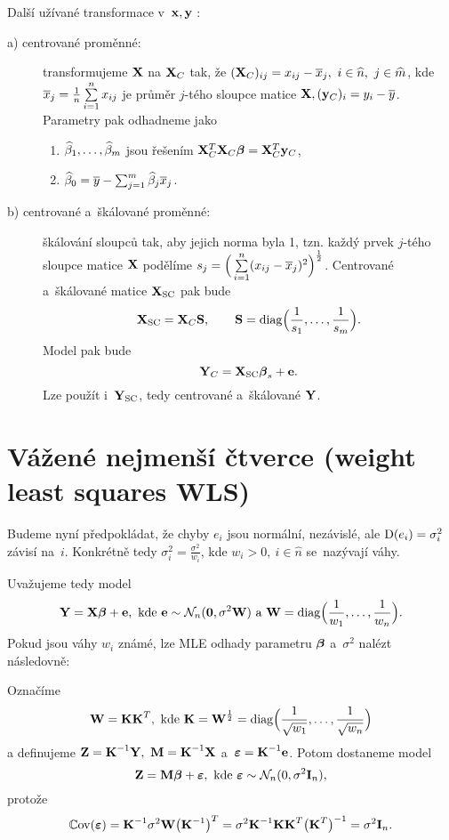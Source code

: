 \begin{remark}
	Další užívané transformace v~$\mathbf{x},\mathbf{y}$ :
	\begin{description}
	\item[a) centrované proměnné:] transformujeme $\mathbf{X}$ na $\mathbf{X}_C$ tak, že $(\mathbf{X}_C)_{ij} = x_{ij}-\overline{x}_j,~i\in\widehat{n},~j\in\widehat{m}$, kde $\overline{x}_j = \frac{1}{n}\sum\limits_{i=1}^{n} x_{ij}$ je průměr $j$-tého sloupce matice $\mathbf{X}, (\mathbf{y}_C)_i = y_i-\overline{y}$. Parametry pak odhadneme jako
	\begin{enumerate}[1)]
		\item $\widehat{\beta}_1, \dots, \widehat{\beta}_m$ jsou řešením $\mathbf{X}_C^T \mathbf{X}_C \boldsymbol{\beta} = \mathbf{X}_C^T \mathbf{y}_C$,
		\item $\widehat{\beta}_0 = \overline{y} - \sum_{j=1}^m \widehat{\beta}_j \overline{x}_j$.
	\end{enumerate}
	\item[b) centrované a~škálované proměnné:] škálování sloupců tak, aby jejich norma byla 1, tzn. každý prvek $j$-tého sloupce matice $\mathbf{X}$ podělíme $s_j = \Big(\sum\limits_{i=1}^{n} (x_{ij}-\overline{x}_j)^2\Big)^{\frac{1}{2}}$. Centrované a~škálované matice $\mathbf{X}_\mathrm{SC}$ pak bude
	 $$
	\mathbf{X}_\mathrm{SC} = \mathbf{X}_C\textbf{S},\qquad \textbf{S} = \mathrm{diag}\Big(\frac{1}{s_1},\dots,\frac{1}{s_m}\Big).
	 $$
	Model pak bude
	 $$
	\mathbf{Y}_C = \mathbf{X}_\mathrm{SC}\boldsymbol{\beta}_s+\mathbf{e}. $$ Lze použít i~$\mathbf{Y}_\mathrm{SC}$, tedy centrované a~škálované $\mathbf{Y}$.
	\end{description}
\end{remark}

\section{Vážené nejmenší čtverce (weight least squares WLS)}
Budeme nyní předpokládat, že chyby $e_i$ jsou normální, nezávislé, ale $\mathrm{D}(e_i) = \sigma_i^2$ závisí na~$i$. Konkrétně tedy $\sigma_i^2 = \frac{\sigma^2}{w_i}$, kde $w_i>0,~i\in\widehat{n}$ se~nazývají váhy.

Uvažujeme tedy model
\begin{equation}\label{rovnickaW}
\mathbf{Y} = \mathbf{X}\boldsymbol{\beta}+\mathbf{e},\text{ kde }\mathbf{e}\sim\mathcal{N}_n(\boldsymbol{0},\sigma^2\textbf{W})\text{ a~}\textbf{W} = \mathrm{diag}\Big(\frac{1}{w_1},\dots,\frac{1}{w_n}\Big).
\end{equation}
Pokud jsou váhy $w_i$ známé, lze MLE odhady parametru $\boldsymbol{\beta}$ a~$\sigma^2$ nalézt následovně:

Označíme
 $$
\textbf{W} = \textbf{K} \textbf{K}^T,\text{ kde }\textbf{K} = \textbf{W}^{\frac{1}{2}} = \mathrm{diag}\Big(\frac{1}{\sqrt{w_1}},\dots,\frac{1}{\sqrt{w_n}}\Big)
 $$
a definujeme $\textbf{Z} = {\textbf{K}^{-1}}\mathbf{Y},~\textbf{M} = {\textbf{K}^{-1}}\mathbf{X}$ a~$\boldsymbol{\varepsilon} = {\textbf{K}^{-1}}\mathbf{e}$. Potom dostaneme model
\begin{equation}\label{rovnickaW2}
\textbf{Z} = \textbf{M}\boldsymbol{\beta}+\boldsymbol{\varepsilon},\text{ kde }\boldsymbol{\varepsilon}\sim\mathcal{N}_n(0,\sigma^2 \textbf{I}_{n}),
\end{equation}
protože
 $$
\mathbb{C}\mathrm{ov}(\boldsymbol{\varepsilon}) = {\textbf{K}^{-1}}\sigma^2\textbf{W}\big({\textbf{K}^{-1}}\big)^T = \sigma^2 {\textbf{K}^{-1}}\textbf{K}\textbf{K}^T\big(\textbf{K}^T\big)^{-1} = \sigma^2 \textbf{I}_{n}.
 $$

